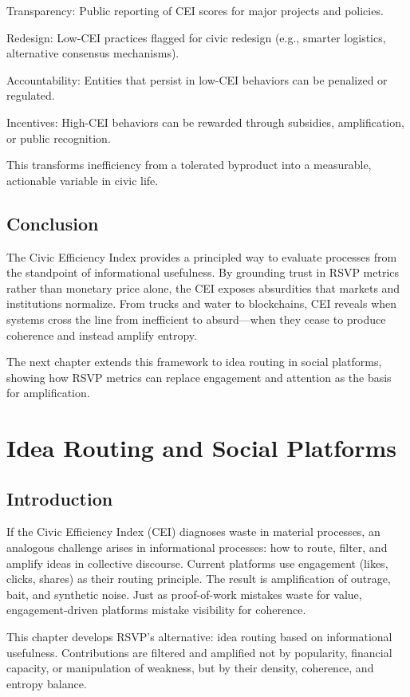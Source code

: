 \documentclass{book}
\begin{document}
Transparency: Public reporting of CEI scores for major projects and policies.

Redesign: Low-CEI practices flagged for civic redesign (e.g., smarter logistics, alternative consensus mechanisms).

Accountability: Entities that persist in low-CEI behaviors can be penalized or regulated.

Incentives: High-CEI behaviors can be rewarded through subsidies, amplification, or public recognition.

This transforms inefficiency from a tolerated byproduct into a measurable, actionable variable in civic life.

\section{Conclusion}

The Civic Efficiency Index provides a principled way to evaluate processes from the standpoint of informational usefulness. By grounding trust in RSVP metrics rather than monetary price alone, the CEI exposes absurdities that markets and institutions normalize. From trucks and water to blockchains, CEI reveals when systems cross the line from inefficient to absurd—when they cease to produce coherence and instead amplify entropy.

The next chapter extends this framework to idea routing in social platforms, showing how RSVP metrics can replace engagement and attention as the basis for amplification.

\chapter{Idea Routing and Social Platforms}

\section{Introduction}

If the Civic Efficiency Index (CEI) diagnoses waste in material processes, an analogous challenge arises in informational processes: how to route, filter, and amplify ideas in collective discourse. Current platforms use engagement (likes, clicks, shares) as their routing principle. The result is amplification of outrage, bait, and synthetic noise. Just as proof-of-work mistakes waste for value, engagement-driven platforms mistake visibility for coherence.

This chapter develops RSVP’s alternative: idea routing based on informational usefulness. Contributions are filtered and amplified not by popularity, financial capacity, or manipulation of weakness, but by their density, coherence, and entropy balance.
\end{document}
